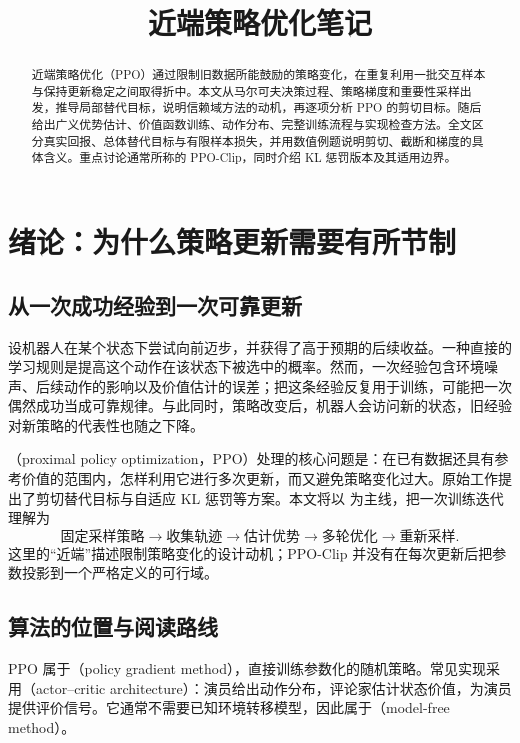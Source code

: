 \documentclass[UTF8]{ctexart}
\title{近端策略优化笔记}
\author{}
\date{}
\begin{document}
\maketitle

\begin{abstract}
近端策略优化（PPO）通过限制旧数据所能鼓励的策略变化，在重复利用一批交互样本与保持更新稳定之间取得折中。本文从马尔可夫决策过程、策略梯度和重要性采样出发，推导局部替代目标，说明信赖域方法的动机，再逐项分析 PPO 的剪切目标。随后给出广义优势估计、价值函数训练、动作分布、完整训练流程与实现检查方法。全文区分真实回报、总体替代目标与有限样本损失，并用数值例题说明剪切、截断和梯度的具体含义。重点讨论通常所称的 PPO-Clip，同时介绍 KL 惩罚版本及其适用边界。
\end{abstract}

\tableofcontents

\section{绪论：为什么策略更新需要有所节制}
\label{sec:ppo-introduction}

\subsection{从一次成功经验到一次可靠更新}

设机器人在某个状态下尝试向前迈步，并获得了高于预期的后续收益。一种直接的学习规则是提高这个动作在该状态下被选中的概率。然而，一次经验包含环境噪声、后续动作的影响以及价值估计的误差；把这条经验反复用于训练，可能把一次偶然成功当成可靠规律。与此同时，策略改变后，机器人会访问新的状态，旧经验对新策略的代表性也随之下降。

（proximal policy optimization，PPO）处理的核心问题是：在已有数据还具有参考价值的范围内，怎样利用它进行多次更新，而又避免策略变化过大。原始工作提出了剪切替代目标与自适应 KL 惩罚等方案\cite{schulman-ppo}。本文将以  为主线，把一次训练迭代理解为
\[
  \text{固定采样策略}
  \longrightarrow \text{收集轨迹}
  \longrightarrow \text{估计优势}
  \longrightarrow \text{多轮优化}
  \longrightarrow \text{重新采样}.
\]
这里的“近端”描述限制策略变化的设计动机；PPO-Clip 并没有在每次更新后把参数投影到一个严格定义的可行域。

\subsection{算法的位置与阅读路线}

PPO 属于（policy gradient method），直接训练参数化的随机策略。常见实现采用（actor--critic architecture）：演员给出动作分布，评论家估计状态价值，为演员提供评价信号。它通常不需要已知环境转移模型，因此属于（model-free method）。
\end{document}
